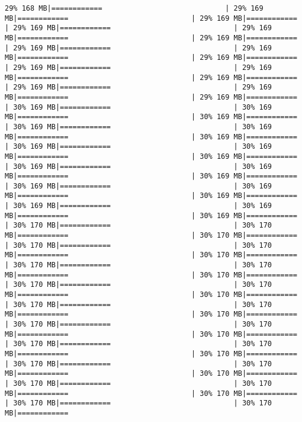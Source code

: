 \documentclass[
]{article}
\begin{document}
\begin{verbatim}
29% 168 MB|============                             | 29% 169 MB|============                             | 29% 169 MB|============                             | 29% 169 MB|============                             | 29% 169 MB|============                             | 29% 169 MB|============                             | 29% 169 MB|============                             | 29% 169 MB|============                             | 29% 169 MB|============                             | 29% 169 MB|============                             | 29% 169 MB|============                             | 29% 169 MB|============                             | 29% 169 MB|============                             | 29% 169 MB|============                             | 29% 169 MB|============                             | 30% 169 MB|============                             | 30% 169 MB|============                             | 30% 169 MB|============                             | 30% 169 MB|============                             | 30% 169 MB|============                             | 30% 169 MB|============                             | 30% 169 MB|============                             | 30% 169 MB|============                             | 30% 169 MB|============                             | 30% 169 MB|============                             | 30% 169 MB|============                             | 30% 169 MB|============                             | 30% 169 MB|============                             | 30% 169 MB|============                             | 30% 169 MB|============                             | 30% 169 MB|============                             | 30% 169 MB|============                             | 30% 169 MB|============                             | 30% 170 MB|============                             | 30% 170 MB|============                             | 30% 170 MB|============                             | 30% 170 MB|============                             | 30% 170 MB|============                             | 30% 170 MB|============                             | 30% 170 MB|============                             | 30% 170 MB|============                             | 30% 170 MB|============                             | 30% 170 MB|============                             | 30% 170 MB|============                             | 30% 170 MB|============                             | 30% 170 MB|============                             | 30% 170 MB|============                             | 30% 170 MB|============                             | 30% 170 MB|============                             | 30% 170 MB|============                             | 30% 170 MB|============                             | 30% 170 MB|============                             | 30% 170 MB|============                             | 30% 170 MB|============                             | 30% 170 MB|============                             | 30% 170 MB|============                             | 30% 170 MB|============                             | 30% 170 MB|============                             | 30% 170 MB|============                             | 30% 170 MB|============                             | 30% 170 MB|============                             | 30% 170 MB|============  
\end{verbatim}
\end{document}
